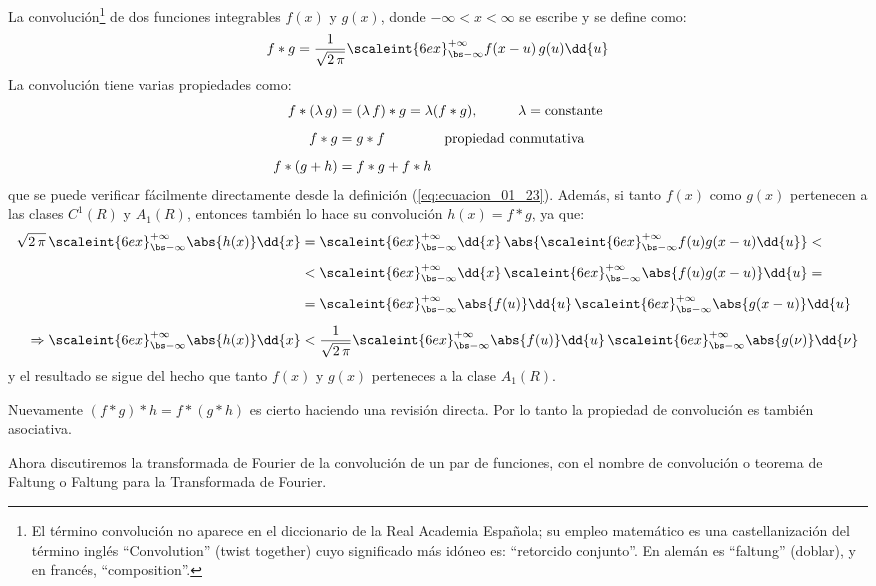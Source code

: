 La convolución\footnote{El término convolución no aparece en el diccionario de la Real Academia Española; su empleo matemático es una castellanización del término inglés \enquote{Convolution} (twist together) cuyo significado más idóneo es: \enquote{retorcido conjunto}. En alemán es \enquote{faltung} (doblar), y en francés, \enquote{composition}.} de dos funciones integrables $f (x)$ y $g(x)$, donde \hfill \break
$-\infty < x < \infty$ se escribe y se define como:
\begin{align}
f * g = \dfrac{1}{\sqrt{2 \, \pi}} \scaleint{6ex}_{\bs -\infty}^{+\infty} f(x - u) \, g(u) \dd{u}
\label{eq:ecuacion_01_23}
\end{align}
La convolución tiene varias propiedades como:
\begin{align*}
f * (\lambda \, g) &= (\lambda \, f) * g = \lambda (f * g), \hspace{1cm} \lambda = \mbox{constante} \\[0.5em]
f * g &= g * f \hspace{1.5cm} \mbox{propiedad conmutativa} \\[0.5em]
f * (g + h) &= f * g + f * h
\end{align*}
que se puede verificar fácilmente directamente desde la definición (\ref{eq:ecuacion_01_23}). \hfill \break 
Además, si tanto $f (x)$ como $g (x)$ pertenecen a las clases $C^{1} (R)$ y $A_{1} (R)$, entonces también lo hace su convolución $h (x) = f * g$, ya que:
\begin{align*}
\sqrt{2 \, \pi} \, \scaleint{6ex}_{\bs -\infty}^{+\infty} \abs{h(x)} \dd{x} &= \scaleint{6ex}_{\bs -\infty}^{+\infty} \dd{x} \, \abs{\scaleint{6ex}_{\bs -\infty}^{+\infty} f(u) g(x - u) \dd{u}} < \\[0.5em]
&< \scaleint{6ex}_{\bs -\infty}^{+\infty} \dd{x} \, \scaleint{6ex}_{\bs -\infty}^{+\infty} \abs{f(u) g(x - u)} \dd{u} = \\[0.5em]
&= \scaleint{6ex}_{\bs -\infty}^{+\infty} \abs{f(u)} \dd{u} \, \scaleint{6ex}_{\bs -\infty}^{+\infty} \abs{g(x - u)} \dd{u} \\[0.5em]
\Rightarrow \scaleint{6ex}_{\bs -\infty}^{+\infty} \abs{h(x)} \dd{x} &< \dfrac{1}{\sqrt{2 \, \pi}} \scaleint{6ex}_{\bs -\infty}^{+\infty} \abs{f(u)} \dd{u} \, \scaleint{6ex}_{\bs -\infty}^{+\infty} \abs{g(\nu)} \dd{\nu}
\end{align*}
y el resultado se sigue del hecho que tanto $f (x)$ y $g(x)$ perteneces a la clase $A_{1}(R)$.
\par
Nuevamente $(f * g) * h = f * (g * h)$ es cierto haciendo una revisión directa. Por lo tanto la propiedad de convolución es también asociativa.
\par
Ahora discutiremos la transformada de Fourier de la convolución de un par de funciones, con el nombre de convolución o teorema de Faltung o Faltung para la Transformada de Fourier.

